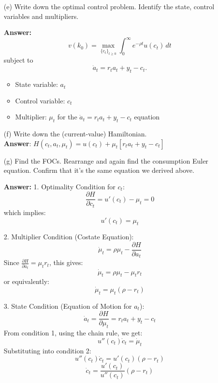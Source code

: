\documentclass[11pt]{extarticle}
\theoremstyle{plain}
\theoremstyle{definition}
\begin{document}
\vspace{5mm}
\begin{enumerate}
\item [(e)] Write down the optimal control problem. Identify the state, control variables and multipliers.

\textbf{Answer:}
\[
v(k_0) = \max_{ \{ c_t \}_{t \geq 0} } \int_0^\infty e^{ -\rho t } u(c_t) \, dt
\]
subject to
\[
\dot{a}_t = r_t a_t + y_t - c_t.
\]
	


\begin{itemize}
    \item State variable: \( a_t \)
    \item Control variable: \( c_t \)
    \item Multiplier: $\mu_t $ for the $\dot{a}_t = r_t a_t + y_t - c_t$ equation
\end{itemize}


	
\item [(f)] Write down the (current-value) Hamiltonian.\\
\textbf{Answer}: \( H(c_t, a_t, \mu_t) = u(c_t) + \mu_t \left[ r_t a_t + y_t - c_t \right] \)
	
\item [(g)] Find the FOCs. Rearrange and again find the consumption Euler equation. Confirm that it's the same equation we derived above. 

\textbf{Answer:} 
1. Optimality Condition for \( c_t \):
\[
\frac{\partial H}{\partial c_t} = u'(c_t) - \mu_t = 0
\]
which implies:
\[
u'(c_t) = \mu_t
\]

2. Multiplier Condition (Costate Equation):
\[
\dot{\mu}_t = \rho \mu_t - \frac{\partial H}{\partial a_t}
\]
Since \( \frac{\partial H}{\partial a_t} = \mu_t r_t \), this gives:
\[
\dot{\mu}_t = \rho \mu_t - \mu_t r_t
\]
or equivalently:
\[
\dot{\mu}_t = \mu_t (\rho - r_t)
\]

3. State Condition (Equation of Motion for \( a_t \)):
\[
\dot{a}_t = \frac{\partial H}{\partial \mu_t} = r_t a_t + y_t - c_t
\]
From condition 1, using the chain rule, we get:
\[
u''(c_t) \dot{c}_t = \dot{\mu}_t
\]
Substituting into condition 2:
\[
u''(c_t) \dot{c}_t = u'(c_t) (\rho - r_t)
\]
\[
\dot{c}_t = \frac{u'(c_t)}{u''(c_t)} (\rho - r_t)
\]
\end{enumerate} 



\vspace{5mm}
\end{document}
